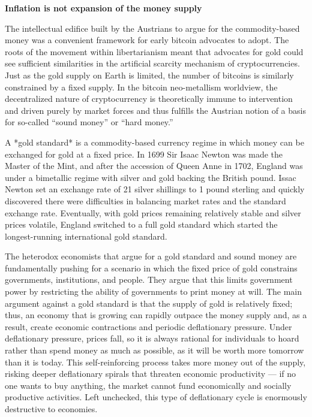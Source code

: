 \begin{infobox}
 \textbf{Inflation is not expansion of the money supply}
\end{infobox}


The intellectual edifice built by the Austrians to argue for the commodity-based
money was a convenient framework for early bitcoin advocates to adopt. The roots
of the movement within libertarianism meant that advocates for gold could see
sufficient similarities in the artificial scarcity mechanism of
cryptocurrencies. Just as the gold supply on Earth is limited, the number of
bitcoins is similarly constrained by a fixed supply. In the bitcoin
neo-metallism worldview, the decentralized nature of cryptocurrency is
theoretically immune to intervention and driven purely by market forces and thus
fulfills the Austrian notion of a basis for so-called ``sound money'' or ``hard
money.''


A *gold standard* is a commodity-based currency regime in which money can be
exchanged for gold at a fixed price. In 1699 Sir Isaac Newton was made the
Master of the Mint, and after the accession of Queen Anne in 1702, England was
under a bimetallic regime with silver and gold backing the British pound. Issac
Newton set an exchange rate of 21 silver shillings to 1 pound sterling and
quickly discovered there were difficulties in balancing market rates and the
standard exchange rate. Eventually, with gold prices remaining relatively stable
and silver prices volatile, England switched to a full gold standard which
started the longest-running international gold standard.


The heterodox economists that argue for a gold standard and sound money are
fundamentally pushing for a scenario in which the fixed price of gold constrains
governments, institutions, and people. They argue that this limits government
power by restricting the ability of governments to print money at will. The main
argument against a gold standard is that the supply of gold is relatively fixed;
thus, an economy that is growing can rapidly outpace the money supply and, as a
result, create economic contractions and periodic deflationary pressure. Under
deflationary pressure, prices fall, so it is always rational for individuals to
hoard rather than spend money as much as possible, as it will be worth more
tomorrow than it is today. This self-reinforcing process takes more money out of
the supply, risking deeper deflationary spirals that threaten economic
productivity --- if no one wants to buy anything, the market cannot fund
economically and socially productive activities. Left unchecked, this type of
deflationary cycle is enormously destructive to economies.

